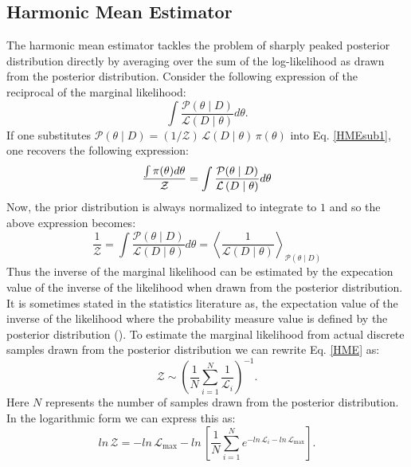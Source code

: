 \subsection{Harmonic Mean Estimator}
The harmonic mean estimator tackles the problem of sharply peaked posterior distribution directly by averaging over the sum of the log-likelihood as drawn from the posterior distribution. Consider the following expression of the reciprocal of the marginal likelihood:
\begin{equation}\label{HMEsub1}
\int \frac{\mathcal{P}(\theta \mid D)}{\mathcal{L}\left(D \mid \theta\right)} d\theta. 
\end{equation}
If one substitutes $\mathcal{P}(\theta \mid D) = (1/\mathcal{Z}) \, \mathcal{L}(D \mid \theta) \, \pi (\theta)$ into Eq. \ref{HMEsub1}, one recovers the following expression:
\begin{equation}\notag
\frac{\int \pi(\theta) d\theta}{\mathcal{Z}} = \int \frac{\mathcal{P}(\theta \mid D)}{\mathcal{L}\left(D \mid \theta\right)} d\theta 
\end{equation}
Now, the prior distribution is always normalized to integrate to $1$ and so the above expression becomes:
\begin{equation}\label{HME}
\frac{1}{\mathcal{Z}} = \int \frac{\mathcal{P}(\theta \mid D)}{\mathcal{L}\left(D \mid \theta\right)} d\theta  = \left \langle \frac{1}{\mathcal{L}(D\mid \theta)} \right \rangle_{\mathcal{P}(\theta \mid D) }
\end{equation}
Thus the inverse of the marginal likelihood can be estimated by the expecation value of the inverse of the likelihood when drawn from the posterior distribution. It is sometimes stated in the statistics literature as, the expectation value of the inverse of the likelihood where the probability measure value is defined by the posterior distribution (). To estimate the marginal likelihood from actual discrete samples drawn from the posterior distribution we can rewrite Eq. \ref{HME} as:
\begin{equation}\label{estim_HME}
    \mathcal{Z} \sim \left(\frac{1}{N} \sum_{i=1}^{N} \frac{1}{\mathcal{L}_i} \right)^{-1}.
\end{equation}
Here $N$ represents the number of samples drawn from the posterior distribution. In the logarithmic form we can express this as:
\begin{equation}\label{estim_logHME}
    ln \, \mathcal{Z} = -ln \, \mathcal{L}_\mathrm{max} - ln \, \left [\frac{1}{N} \sum_{i=1}^{N} e^{-ln \, \mathcal{L}_i -ln \, \mathcal{L}_\mathrm{max}} \right].
\end{equation}
